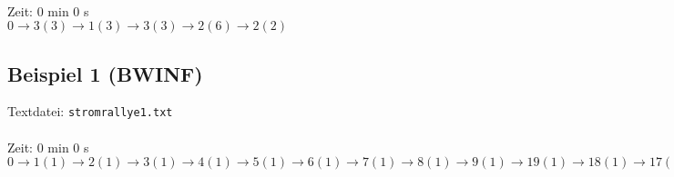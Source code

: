 \documentclass[a4paper,10pt,ngerman]{scrartcl}
\begin{document}
\noindent
{}\\

\noindent
Zeit: 0 min 0 s\\

\noindent
$0 \rightarrow3(3) \rightarrow 1(3) \rightarrow 3(3) \rightarrow 2(6) \rightarrow 2(2)$

\subsection{Beispiel 1 (BWINF)}\label{example:1}
Textdatei: \texttt{stromrallye1.txt}\\

\noindent
{}\\

\noindent
Zeit: 0 min 0 s\\

\noindent
$0 \rightarrow1(1) \rightarrow 2(1) \rightarrow 3(1) \rightarrow 4(1) \rightarrow 5(1) \rightarrow 6(1) \rightarrow 7(1) \rightarrow 8(1) 
\rightarrow 9(1) \rightarrow 19(1) \rightarrow 18(1) \rightarrow 17(1) \rightarrow 16(1) \rightarrow 15(1) \rightarrow 14(1) \rightarrow 13(1) 
\rightarrow 12(1) \rightarrow 11(1) \rightarrow 10(1) \rightarrow 20(1) \rightarrow 21(1) \rightarrow 22(1) \rightarrow 23(1) \rightarrow 24(1) 
\rightarrow 25(1) \rightarrow 26(1) \rightarrow 27(1) \rightarrow 28(1) \rightarrow 29(1) \rightarrow 39(1) \rightarrow 38(1) \rightarrow 37(1) 
\rightarrow 36(1) \rightarrow 35(1) \rightarrow 34(1) \rightarrow 33(1) \rightarrow 32(1) \rightarrow 31(1) \rightarrow 30(1) \rightarrow 40(1) 
\rightarrow 41(1) \rightarrow 42(1) \rightarrow 43(1) \rightarrow 44(1) \rightarrow 45(1) \rightarrow 46(1) \rightarrow 47(1) \rightarrow 48(1) 
\rightarrow 49(1) \rightarrow 59(1) \rightarrow 58(1) \rightarrow 57(1) \rightarrow 56(1) \rightarrow 55(1) \rightarrow 54(1) \rightarrow 53(1) 
\rightarrow 52(1) \rightarrow 51(1) \rightarrow 50(1) \rightarrow 60(1) \rightarrow 61(1) \rightarrow 62(1) \rightarrow 63(1) \rightarrow 64(1) 
\rightarrow 65(1) \rightarrow 66(1) \rightarrow 67(1) \rightarrow 68(1) \rightarrow 69(1) \rightarrow 79(1) \rightarrow 78(1) \rightarrow 77(1) 
\rightarrow 76(1) \rightarrow 75(1) \rightarrow 74(1) \rightarrow 73(1) \rightarrow 72(1) \rightarrow 71(1) \rightarrow 70(1) \rightarrow 80(1) 
\rightarrow 81(1) \rightarrow 82(1) \rightarrow 83(1) \rightarrow 84(1) \rightarrow 85(1) \rightarrow 86(1) \rightarrow 87(1) \rightarrow 88(1) 
\rightarrow 89(1) \rightarrow 99(1) \rightarrow 98(1) \rightarrow 97(1) \rightarrow 96(1) \rightarrow 95(1) \rightarrow 94(1) \rightarrow 93(1) 
\rightarrow 92(1) \rightarrow 91(1) \rightarrow 90(1) \rightarrow 80(1) \rightarrow 91(1) 
$
\end{document}

